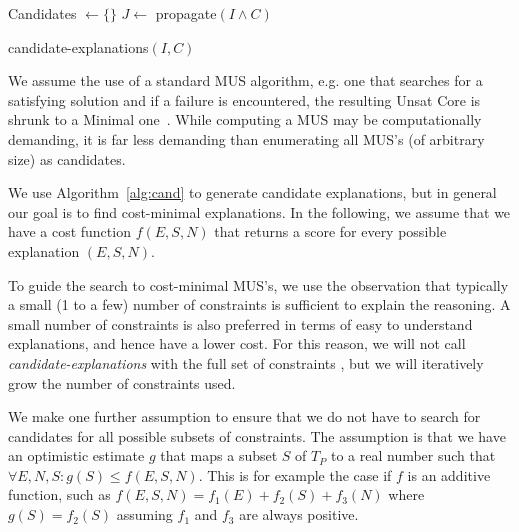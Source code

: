 \begin{algorithm}
% 


  Candidates $\gets \{\}$\;
  $J \gets$ propagate$(I \wedge C)$\;
\caption{candidate-explanations$(I,C)$}

\label{alg:cand}
\end{algorithm}

We assume the use of a standard MUS algorithm, e.g. one that searches for a satisfying solution and if a failure is encountered, the resulting Unsat Core is shrunk to a Minimal one~\cite{marques2010minimal}. While computing a MUS may be computationally demanding, it is far less demanding than enumerating all MUS's (of arbitrary size) as candidates. 

We use Algorithm~\ref{alg:cand} to generate candidate explanations, but in general our goal is to find cost-minimal explanations. In the following, we assume that we have a cost function $f(E, S, N)$ that returns a score for every possible explanation $(E, S, N)$. 

To guide the search to cost-minimal MUS's, we use the observation that typically a small (1 to a few) number of constraints is sufficient to explain the reasoning. A small number of constraints is also preferred in terms of easy to understand explanations, and hence have a lower cost. For this reason, we will  not call \textit{candidate-explanations} with the full set of constraints \allconstraints, but we will iteratively grow the number of constraints used. 

We make one further assumption to ensure that we do not have to search for candidates for all possible subsets of constraints. The assumption is that we have an optimistic estimate $g$ that maps a subset $S$ of $T_P$ to a real number such that  $\forall E, N, S: g(S) \leq f(E, S, N)$. This is for example the case if $f$ is an additive function, such as $f(E, S, N) = f_1(E) + f_2(S) + f_3(N)$ where $g(S) = f_2(S)$ assuming $f_1$ and $f_3$ are always positive.

